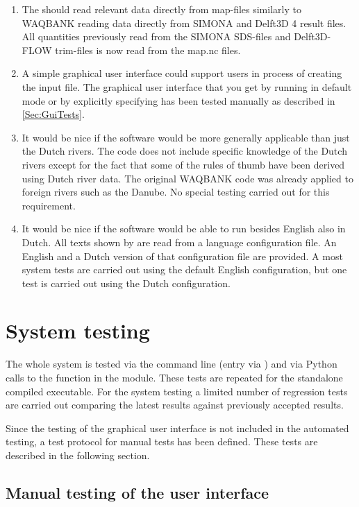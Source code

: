 \begin{enumerate}
\item The should read relevant data directly from \dflowfm map-files similarly to WAQBANK reading data directly from SIMONA and Delft3D 4 result files.
All quantities previously read from the SIMONA SDS-files and Delft3D-FLOW trim-files is now read from the \dflowfm map.nc files.

\item A simple graphical user interface could support users in process of creating the input file.
The graphical user interface that you get by running \dfastbe in default mode or by explicitly specifying  has been tested manually as described in \autoref{Sec:GuiTests}.

\item It would be nice if the software would be more generally applicable than just the Dutch rivers.
The code does not include specific knowledge of the Dutch rivers except for the fact that some of the rules of thumb have been derived using Dutch river data.
The original WAQBANK code was already applied to foreign rivers such as the Danube.
No special testing carried out for this requirement.

\item It would be nice if the software would be able to run besides English also in Dutch.
All texts shown by \dfastbe are read from a language configuration file.
An English and a Dutch version of that configuration file are provided.
A most system tests are carried out using the default English configuration, but one test is carried out using the Dutch configuration.
\end{enumerate}

\section{System testing}

The whole system is tested via the command line (entry via ) and via Python calls to the  function in the  module.
These tests are repeated for the standalone compiled \dfastbe executable.
For the system testing a limited number of regression tests are carried out comparing the latest results against previously accepted results.

Since the testing of the graphical user interface is not included in the automated testing, a test protocol for manual tests has been defined.
These tests are described in the following section.

\subsection{Manual testing of the user interface} \label{Sec:GuiTests}

